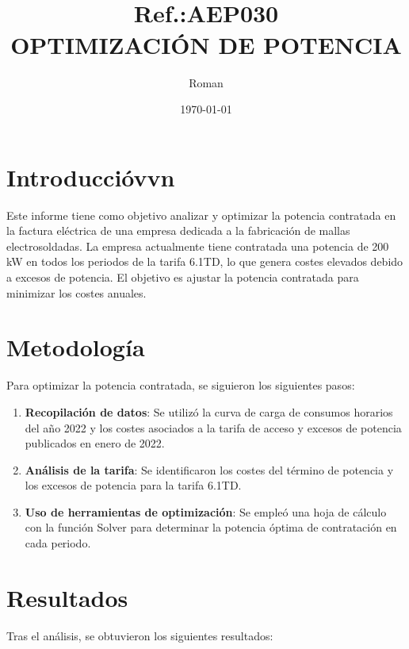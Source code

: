 \documentclass[a4paper,10pt,twocolumn]{article}
\title{{ \qrcode[height=1.3cm]{https://doctec.blog/} \\ \small Ref.:\uppercase{Aep030}}\\{\textbf{OPTIMIZACIÓN DE POTENCIA}}}
\author{
Roman
}
\date{\today}
\begin{document}
\begin{Form}
	\maketitle

	\tableofcontents  %
	\listoffigures    %
	\listoftables     %



    









\section{Introduccióvvn}
Este informe tiene como objetivo analizar y optimizar la potencia contratada en la factura eléctrica de una empresa dedicada a la fabricación de mallas electrosoldadas. La empresa actualmente tiene contratada una potencia de 200 kW en todos los periodos de la tarifa 6.1TD, lo que genera costes elevados debido a excesos de potencia. El objetivo es ajustar la potencia contratada para minimizar los costes anuales.

\section{Metodología}
Para optimizar la potencia contratada, se siguieron los siguientes pasos:

\begin{enumerate}
    \item \textbf{Recopilación de datos}: Se utilizó la curva de carga de consumos horarios del año 2022 y los costes asociados a la tarifa de acceso y excesos de potencia publicados en enero de 2022.
    \item \textbf{Análisis de la tarifa}: Se identificaron los costes del término de potencia y los excesos de potencia para la tarifa 6.1TD.
    \item \textbf{Uso de herramientas de optimización}: Se empleó una hoja de cálculo con la función Solver para determinar la potencia óptima de contratación en cada periodo.
\end{enumerate}

\section{Resultados}
Tras el análisis, se obtuvieron los siguientes resultados:




\end{Form}
\end{document}
